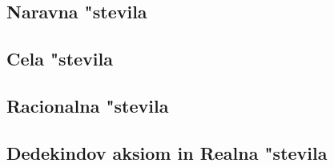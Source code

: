 \subsection{Naravna "stevila}


\subsection{Cela "stevila}


\subsection{Racionalna "stevila}


\subsection{Dedekindov aksiom in Realna "stevila}

